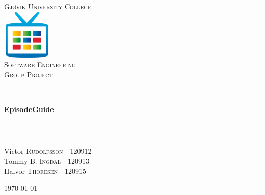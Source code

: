 \documentclass[12pt]{article} %
\begin{document}

\begin{titlepage}

\newcommand{\HRule}{\rule{\linewidth}{0.5mm}} %

\center %

\textsc{\LARGE Gjøvik University College}\\[0.5cm] %
\includegraphics[width=90px, height=90px]{graphics/google_tv_logo}\\[0.8cm] %
\textsc{\Large Software Engineering}\\[0.5cm] %
\textsc{\large Group Project}\\[0.5cm] %

\HRule \\[0.4cm]
{ \huge \bfseries EpisodeGuide}\\[0.4cm] %
\HRule \\[1.5cm]

\begin{minipage}{0.44\textwidth}
\begin{flushleft} \large
Victor \textsc{Rudolfsson} - 120912\\ %
Tommy \textsc{B. Ingdal} - 120913\\ %
Halvor \textsc{Thoresen} - 120915\\ %
\end{flushleft}
\end{minipage}

\vfill %
{\large \today}\\[3cm] %

\end{titlepage}
\end{document}
